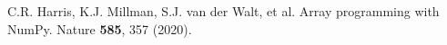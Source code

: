 \documentclass[twocolumn,preprintnumbers,amsmath,amssymb,aps,prx]{revtex4}
\begin{document}
\begin{thebibliography}{99}
     C.R. Harris, K.J. Millman, S.J. van der Walt, et al. Array programming with NumPy. Nature {\bf 585}, 357 (2020). %
    














\end{thebibliography}
\end{document}
